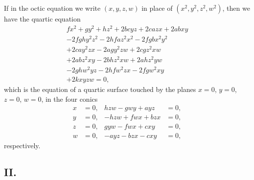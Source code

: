 \documentclass[12pt,a4paper]{article}
\theoremstyle{plain}
\begin{document}
If in the octic equation we write $(x, y, z, w)$ in place of $(x^{2}, y^{2}, z^{2}, w^{2})$, then we have the quartic equation
%
\begin{multline}
fx^{2} + gy^{2} + hz^{2} + 2bc yz + 2ca zx + 2ab xy \\
- 2fgh y^{2} z^{2} - 2hfa z^{2} x^{2} - 2fgb x^{2} y^{2} \\
+ 2cay^{2}zx - 2agy^{2}zw + 2cgz^{2}xw \\
+ 2abz^{2}xy - 2bhz^{2}xw + 2ahz^{2}yw \\
- 2ghw^{2}yz - 2hfw^{2}zx - 2fgw^{2}xy \\
+ 2kxyzw = 0,
\end{multline}
%
which is the equation of a quartic surface touched by the planes $x=0$, $y=0$, $z=0$, $w=0$, in the four conics
\begin{align*}
x&=0, & hzw - gwy + ayz &= 0, \\
y&=0, & -hzw + fwx + bzx &= 0, \\
z&=0, & gyw - fwx + cxy &= 0, \\
w&=0, & -ayz - bzx - cxy &= 0,
\end{align*}
respectively.

\subsection*{II.}
\end{document}
